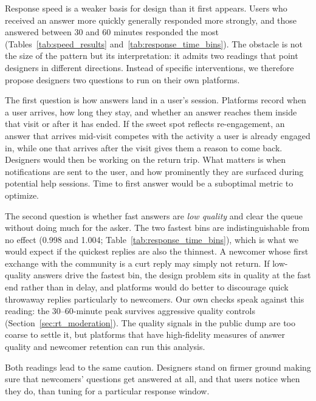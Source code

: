 

Response speed is a weaker basis for design than it first appears. Users who received an answer more quickly generally responded more strongly, and those answered between 30 and 60 minutes responded the most (Tables~\ref{tab:speed_results} and~\ref{tab:response_time_bins}). The obstacle is not the size of the pattern but its interpretation: it admits two readings that point designers in different directions. Instead of specific interventions, we therefore propose designers two questions to run on their own platforms.

The first question is how answers land in a user's session. Platforms record when a user arrives, how long they stay, and whether an answer reaches them inside that visit or after it has ended. If the sweet spot reflects re-engagement, an answer that arrives mid-visit competes with the activity a user is already engaged in, while one that arrives after the visit gives them a reason to come back. Designers would then be working on the return trip. What matters is when notifications are sent to the user, and how prominently they are surfaced during potential help sessions. Time to first answer would be a suboptimal metric to optimize.

The second question is whether fast answers are \emph{low quality} and clear the queue without doing much for the asker. The two fastest bins are indistinguishable from no effect (0.998 and 1.004; Table~\ref{tab:response_time_bins}), which is what we would expect if the quickest replies are also the thinnest. A newcomer whose first exchange with the community is a curt reply may simply not return. If low-quality answers drive the fastest bin, the design problem sits in quality at the fast end rather than in delay, and platforms would do better to discourage quick throwaway replies particularly to newcomers. Our own checks speak against this reading: the 30--60-minute peak survives aggressive quality controls (Section~\ref{sec:rt_moderation}). The quality signals in the public dump are too coarse to settle it, but platforms that have high-fidelity measures of answer quality and newcomer retention can run this analysis.

Both readings lead to the same caution. Designers stand on firmer ground making sure that newcomers' questions get answered at all, and that users notice when they do, than tuning for a particular response window.

